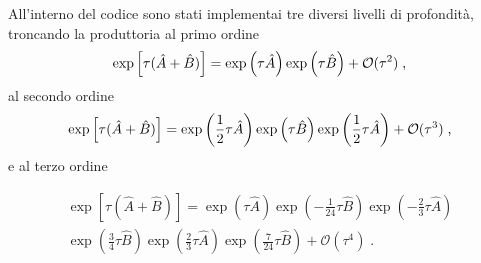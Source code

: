 \documentclass[12pt]{report}
\begin{document}
All'interno del codice sono stati implementai tre diversi livelli di profondità, troncando la produttoria al primo ordine
\begin{equation}
    \centering
    \exp \left[\tau (\hat{A} + \hat{B})\right]
    =  \exp \left( \tau \hat{A} \right)   \exp \left(\tau \hat{B} \right) + \mathcal{O}(\tau^{2}) \; \text{,}
    \label{eq:LT_1}
\end{equation}
al secondo ordine 
\begin{equation}
    \centering
    \exp \left[\tau (\hat{A} + \hat{B})\right]
    =  \exp \left(\frac{1}{2} \tau \hat{A} \right)   \exp \left(\tau \hat{B} \right)   \exp \left(\frac{1}{2} \tau \hat{A} \right) +  \mathcal{O}(\tau^{3}) \; \text{,}
    \label{eq:LT_2}
\end{equation}
e al terzo ordine

\begin{multline}
    \exp \left[\tau (\hat{A} + \hat{B})\right]
    =  \exp \left( \tau \hat{A} \right)   \exp \left( - \frac{1}{24}  \tau \hat{B} \right)  \exp \left( - \frac{2}{3} \tau \hat{A} \right)   \\    \exp \left( \frac{3}{4} \tau \hat{B} \right)  \exp \left( \frac{2}{3} \tau \hat{A} \right)   \exp \left( \frac{7}{24} \tau \hat{B} \right)   +  \mathcal{O}(\tau^{4}) \; \text{.}
    \label{eq:LT_3}
\end{multline}
\end{document}
